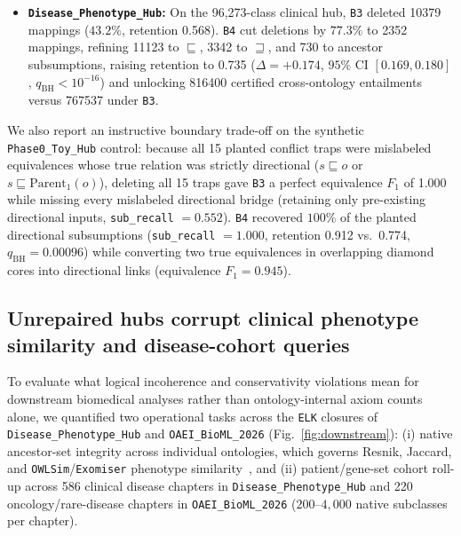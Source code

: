 \documentclass[10pt]{article}
\theoremstyle{accentdef}
\newcommand{\ClaspDiseasePhenotypeHubVsBThreeMean}{0.174}
\newcommand{\ClaspDiseasePhenotypeHubVsBThreeLow}{0.169}
\newcommand{\ClaspDiseasePhenotypeHubVsBThreeHigh}{0.180}
\newcommand{\ClaspDiseasePhenotypeHubChapterCount}{586}
\newcommand{\ClaspDiseasePhenotypeHubBASPBinaryDeleteRetention}{0.568}
\newcommand{\ClaspDiseasePhenotypeHubBASPBinaryDeleteNovelCross}{767537}
\newcommand{\ClaspDiseasePhenotypeHubBASPBinaryDeleteDropped}{10379}
\newcommand{\ClaspDiseasePhenotypeHubBLexicalLatticeRetention}{0.735}
\newcommand{\ClaspDiseasePhenotypeHubBLexicalLatticeNovelCross}{816400}
\newcommand{\ClaspDiseasePhenotypeHubBLexicalLatticeDowngradeSub}{11123}
\newcommand{\ClaspDiseasePhenotypeHubBLexicalLatticeDowngradeSup}{3342}
\newcommand{\ClaspDiseasePhenotypeHubBLexicalLatticeWeakenAncestor}{730}
\newcommand{\ClaspDiseasePhenotypeHubBLexicalLatticeDropped}{2352}
\newcommand{\ClaspOAEIBioMLChapterCount}{220}
\newcommand{\ClaspPhaseToyHubBASPBinaryDeleteRetention}{0.774}
\newcommand{\ClaspPhaseToyHubBASPBinaryDeleteEquivFone}{1.000}
\newcommand{\ClaspPhaseToyHubBASPBinaryDeleteSubRecall}{0.552}
\newcommand{\ClaspPhaseToyHubBLexicalLatticeRetention}{0.912}
\newcommand{\ClaspPhaseToyHubBLexicalLatticeEquivFone}{0.945}
\newcommand{\ClaspPhaseToyHubBLexicalLatticeSubRecall}{1.000}
\begin{document}
\begin{itemize}
  \item \textbf{\texttt{Disease\_Phenotype\_Hub}:} On the 96,273-class clinical hub, \texttt{B3} deleted \num{\ClaspDiseasePhenotypeHubBASPBinaryDeleteDropped} mappings ($43.2\%$, retention \ClaspDiseasePhenotypeHubBASPBinaryDeleteRetention{}). \texttt{B4} cut deletions by $77.3\%$ to \num{\ClaspDiseasePhenotypeHubBLexicalLatticeDropped} mappings, refining \num{\ClaspDiseasePhenotypeHubBLexicalLatticeDowngradeSub} to $\sqsubseteq$, \num{\ClaspDiseasePhenotypeHubBLexicalLatticeDowngradeSup} to $\sqsupseteq$, and \num{\ClaspDiseasePhenotypeHubBLexicalLatticeWeakenAncestor} to ancestor subsumptions, raising retention to \ClaspDiseasePhenotypeHubBLexicalLatticeRetention{} ($\Delta = +\ClaspDiseasePhenotypeHubVsBThreeMean{}$, $95\%$ CI $[\ClaspDiseasePhenotypeHubVsBThreeLow{}, \ClaspDiseasePhenotypeHubVsBThreeHigh{}]$, $q_{\mathrm{BH}} < 10^{-16}$) and unlocking \num{\ClaspDiseasePhenotypeHubBLexicalLatticeNovelCross} certified cross-ontology entailments versus \num{\ClaspDiseasePhenotypeHubBASPBinaryDeleteNovelCross} under \texttt{B3}.
\end{itemize}

We also report an instructive boundary trade-off on the synthetic \texttt{Phase0\_Toy\_Hub} control: because all 15 planted conflict traps were mislabeled equivalences whose true relation was strictly directional ($s \sqsubseteq o$ or $s \sqsubseteq \mathrm{Parent}_1(o)$), deleting all 15 traps gave \texttt{B3} a perfect equivalence $F_1$ of \ClaspPhaseToyHubBASPBinaryDeleteEquivFone{} while missing every mislabeled directional bridge (retaining only pre-existing directional inputs, \texttt{sub\_recall} $= \ClaspPhaseToyHubBASPBinaryDeleteSubRecall{}$). \texttt{B4} recovered $100\%$ of the planted directional subsumptions (\texttt{sub\_recall} $= \ClaspPhaseToyHubBLexicalLatticeSubRecall{}$, retention \ClaspPhaseToyHubBLexicalLatticeRetention{} vs.\ \ClaspPhaseToyHubBASPBinaryDeleteRetention{}, $q_{\mathrm{BH}} = 0.00096$) while converting two true equivalences in overlapping diamond cores into directional links (equivalence $F_1 = \ClaspPhaseToyHubBLexicalLatticeEquivFone{}$).

\subsection*{Unrepaired hubs corrupt clinical phenotype similarity and disease-cohort queries}

To evaluate what logical incoherence and conservativity violations mean for downstream biomedical analyses rather than ontology-internal axiom counts alone, we quantified two operational tasks across the \texttt{ELK} closures of \texttt{Disease\_Phenotype\_Hub} and \texttt{OAEI\_BioML\_2026} (Fig.~\ref{fig:downstream}): (i) native ancestor-set integrity across individual ontologies, which governs Resnik, Jaccard, and \texttt{OWLSim}/\texttt{Exomiser} phenotype similarity~\cite{smedley2015exomiser}, and (ii) patient/gene-set cohort roll-up across \num{\ClaspDiseasePhenotypeHubChapterCount} clinical disease chapters in \texttt{Disease\_Phenotype\_Hub} and \num{\ClaspOAEIBioMLChapterCount} oncology/rare-disease chapters in \texttt{OAEI\_BioML\_2026} ($200\text{--}4{,}000$ native subclasses per chapter).
\end{document}
